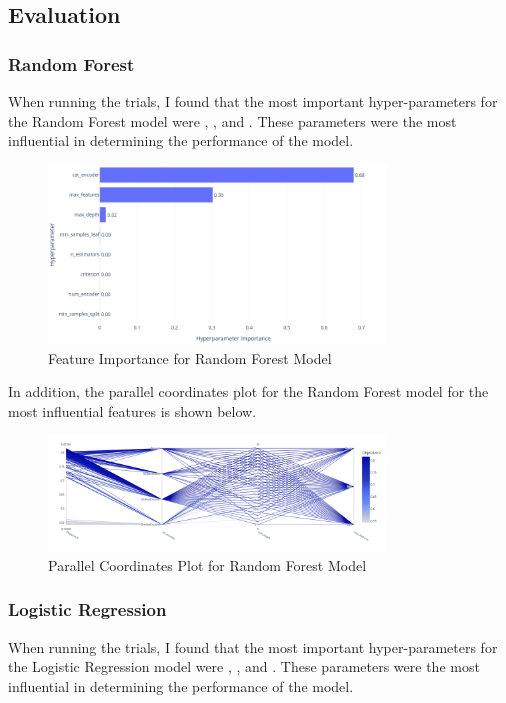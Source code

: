 \documentclass{article}
\begin{document}
\subsection{Evaluation}

\subsubsection{Random Forest}
When running the trials, I found that the most important hyper-parameters for the Random Forest model were , , and . These parameters were the most influential in determining the performance of the model. 

\begin{figure}[H]
  \centering
  \includegraphics[width=0.8\textwidth]{img/random_forest_importance.png}
  \caption{Feature Importance for Random Forest Model}
\end{figure}

\noindent In addition, the parallel coordinates plot for the Random Forest model for the most influential features is shown below.

\begin{figure}[H]
  \centering
  \includegraphics[width=0.8\textwidth]{img/tmp.png}
  \caption{Parallel Coordinates Plot for Random Forest Model}
\end{figure}

\subsubsection{Logistic Regression}
When running the trials, I found that the most important hyper-parameters for the Logistic Regression model were , , and . These parameters were the most influential in determining the performance of the model.
\end{document}
